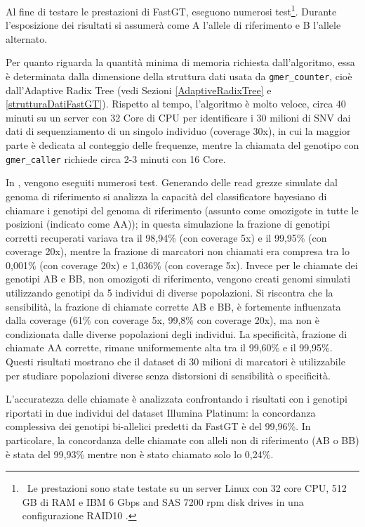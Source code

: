\documentclass[../main.tex]{subfiles}
\begin{document}
Al fine di testare le prestazioni di FastGT, \cite{pajuste2017fastgt} eseguono numerosi test\footnote{\ Le prestazioni sono state testate su un server Linux con 32 core CPU, 512 GB di RAM e IBM 6 Gbps and SAS 7200 rpm disk drives in una configurazione RAID10 \cite{pajuste2017fastgt}.}. Durante l'esposizione dei risultati si assumerà come A l'allele di riferimento e B l'allele alternato.

Per quanto riguarda la quantità minima di memoria richiesta dall'algoritmo, essa è determinata dalla dimensione della struttura dati usata da \texttt{gmer\_counter}, cioè dall'Adaptive Radix Tree (vedi Sezioni \ref{AdaptiveRadixTree}  e \ref{strutturaDatiFastGT}). Rispetto al tempo, l'algoritmo è molto veloce, circa 40 minuti su un server con 32 Core di CPU per identificare i 30 milioni di SNV dai dati di sequenziamento di un singolo individuo (coverage 30x), in cui la maggior parte è dedicata al conteggio delle frequenze, mentre la chiamata del genotipo con \texttt{gmer\_caller} richiede circa 2-3 minuti con 16 Core.

In \cite{pajuste2017fastgt}, vengono eseguiti numerosi test. Generando delle read grezze simulate dal genoma di riferimento si analizza la capacità del classificatore bayesiano di chiamare i genotipi del genoma di riferimento (assunto come omozigote in tutte le posizioni (indicato come AA)); in questa simulazione la frazione di genotipi corretti recuperati variava tra il 98,94\% (con coverage 5x) e il 99,95\% (con coverage 20x), mentre la frazione di marcatori non chiamati era compresa tra lo 0,001\% (con coverage 20x) e 1,036\% (con coverage 5x). Invece per le chiamate dei genotipi AB e BB, non omozigoti di riferimento, vengono creati genomi simulati utilizzando genotipi da 5 individui di diverse popolazioni. Si riscontra che la sensibilità, la frazione di chiamate corrette AB e BB, è fortemente influenzata dalla coverage (61\% con coverage 5x, 99,8\% con coverage 20x), ma non è condizionata dalle diverse popolazioni degli individui. La specificità, frazione di chiamate AA corrette, rimane uniformemente alta tra il 99,60\% e il 99,95\%. Questi risultati mostrano che il dataset di 30 milioni di marcatori è utilizzabile per studiare popolazioni diverse senza distorsioni di sensibilità o specificità.

L'accuratezza delle chiamate è analizzata confrontando i risultati con i genotipi riportati in due individui del dataset Illumina Platinum: la concordanza complessiva dei genotipi bi-allelici predetti da FastGT è del 99,96\%. In particolare, la concordanza delle chiamate con alleli non di riferimento (AB o BB) è stata del 99,93\% mentre non è stato chiamato solo lo 0,24\%.
\end{document}
